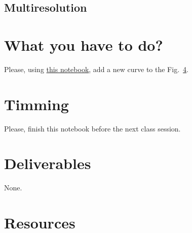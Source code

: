 \subsection{Multiresolution}

\section{What you have to do?}
  
Please, using \href{}{this notebook}, add a new curve to the Fig.~\ref{}.

\section{Timming}

Please, finish this notebook before the next class session.

\section{Deliverables}

None.

\section{Resources}


